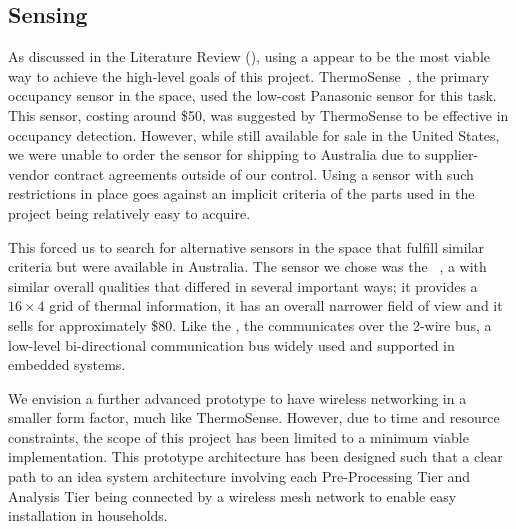 \documentclass[../thesis/thesis.tex]{subfiles}
\begin{document}
\subsection{Sensing}
As discussed in the Literature Review (), using a \iar appear to be the most viable way to achieve the high-level goals of this project. ThermoSense~\cite{beltran2013thermosense}, the primary occupancy sensor in the \iar space, used the low-cost Panasonic \geye sensor for this task. This sensor, costing around \$50, was suggested by ThermoSense to be effective in occupancy detection. However, while still available for sale in the United States, we were unable to order the sensor for shipping to Australia due to supplier-vendor contract agreements outside of our control. Using a sensor with such restrictions in place goes against an implicit criteria of the parts used in the project being relatively easy to acquire.

This forced us to search for alternative sensors in the space that fulfill similar criteria but were available in Australia. The sensor we chose was the \mlx~\cite{MLXDatasheet}, a \iar with similar overall qualities that differed in several important ways; it provides a $16 \times 4$ grid of thermal information, it has an overall narrower field of view and it sells for approximately \$80. Like the \geye, the \mlx communicates over the 2-wire \iic bus, a low-level bi-directional communication bus widely used and supported in embedded systems.

We envision a further advanced prototype to have wireless networking in a smaller form factor, much like ThermoSense. However, due to time and resource constraints, the scope of this project has been limited to a minimum viable implementation. This prototype architecture has been designed such that a clear path to an idea system architecture involving each Pre-Processing Tier and Analysis Tier being connected by a wireless mesh network to enable easy installation in households.
\end{document}
